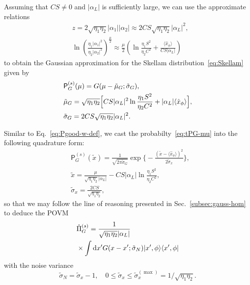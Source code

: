 \documentclass[%
reprint,
superscriptaddress,
 amsmath,amssymb,amsfonts,
 aps,
 pra,
 longbibliography
]{revtex4-2}
\newcommand{\avr}[1]{\ensuremath{\langle{#1}\rangle}}
\newcommand{\prob}{\mathsf{P}}
\newcommand{\dd}{\mathrm{d}}
\begin{document}
Assuming that $CS\ne 0$ and $|\alpha_L|$ is sufficiently large,
we can use the approximate relations
\begin{align}
  &
    \label{eq:z1-A}
    z=2\sqrt{\eta_1\eta_2}|\alpha_1||\alpha_2|
    \approx
    2CS\sqrt{\eta_1\eta_2}|\alpha_L|^2,
  \\
  &
    \label{eq:z2-A}
    \ln \left(\frac{{\eta_1}|\alpha_1|^2}{{\eta_2}|\alpha_2|^2}\right)^{\frac{\mu}{2}}\approx
    \frac{\mu}{2}\left(
    \ln\frac{\eta_1S^2}{\eta_2C^2}+\frac{\langle\hat{x}_\phi\rangle}{CS|\alpha_L|}\right)
    \end{align}
    to obtain the Gaussian approximation for the Skellam distribution~\eqref{eq:Skellam}
    given by
\begin{align}
  &
  \label{eq:tPG-mu}
        {\prob}_G^{(s)}(\mu)=G(\mu-\tilde{\mu}_G;\tilde{\sigma}_G),
  \\
  &
  \label{eq:tmu_G}
  \tilde{\mu}_G=\sqrt{\eta_1\eta_2}\Bigl[
  CS |\alpha_L|^2\ln\frac{\eta_1S^2}{\eta_2C^2}+
  |\alpha_L|\avr{\hat{x}_{\phi}}
  \Bigr],
  \\
  &
      \label{eq:tsgm_G}
    \tilde{\sigma}_G=
    2CS\sqrt{\eta_1\eta_2}|\alpha_L|^2.
\end{align}



Similar to Eq.~\eqref{eq:Pgood-w-def},
we cast the probabilty~\eqref{eq:tPG-mu}
into the following quadrature form: 
\begin{align}
  &
    \label{eq:tPG-tx}
{\prob}_G^{(s)}(\tilde{x})=\frac{1}{\sqrt{2\pi\tilde{\sigma}_G}}
    \exp \biggl\{-\frac{(\tilde{x}-\avr{\hat{x}_\phi})^2}{2\tilde{\sigma}_x}\biggr\},
  \\
  &
    \label{eq:tld-x}
    \tilde{x}=\frac{\mu}{{\sqrt{\eta_1\eta_2}|\alpha_L|}}-
    CS|\alpha_L|\ln\frac{\eta_1S^2}{\eta_2C^2},
    \\
  &
    \label{eq:tsgm_x}
    \tilde{\sigma}_x=\frac{2CS}{\sqrt{\eta_1\eta_2}},
\end{align}
so that we may follow the line of reasoning
presented in Sec.~\ref{subsec:gauss-hom}
to deduce the POVM
\begin{align}
  &
\label{eq:tpovm}    
    \hat{\Pi}_G^{(s)}=\frac{1}{\sqrt{\eta_1\eta_2}|\alpha_L|}
    \notag
  \\
  &
    \times
    \int \dd x' G(x-x'; \tilde{\sigma}_N)|x',\phi\rangle\langle x',\phi|
\end{align}
with the noise variance
\begin{equation}
  \label{eq:tsigm-N}
  \tilde{\sigma}_N=\tilde{\sigma}_x-1,
  \quad
  0 \le \tilde{\sigma}_x\le \tilde{\sigma}_x^{(\max)}=1/\sqrt{\eta_1\eta_2}.
\end{equation}
\end{document}

